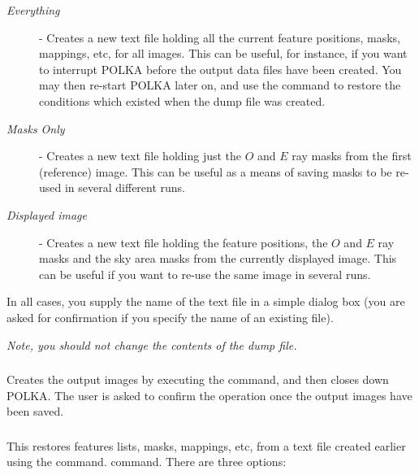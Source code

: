 \begin{description}

\item [{\em Everything}] - Creates a new text file holding all the current 
feature positions, masks, mappings, etc, for all images. This can be useful, 
for instance, if you want to interrupt POLKA before the output data files 
have been created. You may then re-start POLKA later on, and use the 
 command to restore the conditions 
which existed when the dump file was created. 

\item [{\em Masks Only}] - Creates a new text file holding just the $O$
and $E$ ray masks from the first (reference) image. This can be useful
as a means of saving masks to be re-used in several different runs.

\item [{\em Displayed image}] - Creates a new text file holding the
feature positions, the $O$ and $E$ ray masks and the sky area masks from the 
currently displayed image. This can be useful if you want to re-use the
same image in several runs.

\end{description}

In all cases, you supply the name of the text file in a simple dialog
box (you are asked for confirmation if you specify the name of an
existing file).

{\em {\center Note, you should not change the contents of the dump file.}}

\subsubsection {} Creates the output images by executing
the  command, and then closes down
POLKA. The user is asked to confirm the operation once the output images
have been saved.

\subsubsection {} 
This restores features lists, masks, mappings, etc, from a text file
created earlier using the  command.
 command. There are three
options:

